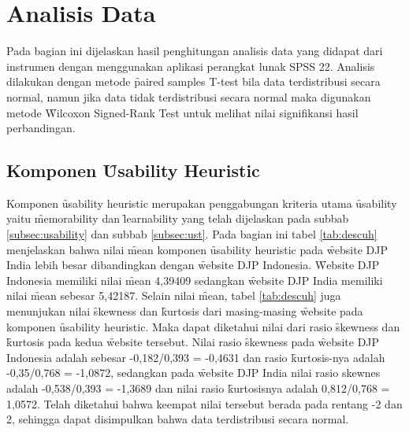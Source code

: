 \section{Analisis Data}
Pada bagian ini dijelaskan hasil penghitungan analisis data yang didapat dari instrumen dengan menggunakan aplikasi perangkat lunak SPSS 22. Analisis dilakukan dengan metode \f{paired samples T-test} bila data terdistribusi secara normal, namun jika data tidak terdistribusi secara normal maka digunakan metode \f{Wilcoxon Signed-Rank Test} untuk melihat nilai signifikansi hasil perbandingan.
\subsection{Komponen \f{Usability Heuristic}}
Komponen \f{usability heuristic} merupakan penggabungan kriteria utama \f{usability} yaitu \f{memorability} dan \f{learnability} yang telah dijelaskan pada subbab \ref{subsec:usability} dan subbab \ref{subsec:ust}. Pada bagian ini tabel \ref{tab:descuh} menjelaskan bahwa nilai \f{mean} komponen \f{usability heuristic} pada \f{website} DJP India lebih besar dibandingkan dengan \f{website} DJP Indonesia. \f{Website} DJP Indonesia memiliki nilai \f{mean} 4,39409 sedangkan \f{website} DJP India memiliki nilai \f{mean} sebesar 5,42187. Selain nilai \f{mean}, tabel \ref{tab:descuh} juga menunjukan nilai \f{skewness} dan \f{kurtosis} dari masing-masing \f{website} pada komponen \f{usability heuristic}. Maka dapat diketahui nilai dari rasio \f{skewness} dan \f{kurtosis} pada kedua \f{website} tersebut. Nilai rasio \f{skewness} pada \f{website} DJP Indonesia adalah sebesar -0,182/0,393 = -0,4631 dan rasio \f{kurtosis}-nya adalah -0,35/0,768 = -1,0872, sedangkan pada \f{website} DJP India nilai rasio skewnes adalah -0,538/0,393 = -1,3689 dan nilai rasio \f{kurtosis}nya adalah 0,812/0,768 = 1,0572. Telah diketahui bahwa keempat nilai tersebut berada pada rentang -2 dan 2, sehingga dapat disimpulkan bahwa data terdistribusi secara normal. 
